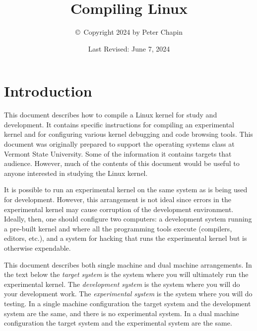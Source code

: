 \documentclass{article}
\newcommand{\newterm}[1]{\textit{#1}}
\begin{document}
\title{Compiling Linux}
\author{\copyright\ Copyright 2024 by Peter Chapin}
\date{Last Revised: June 7, 2024}
\maketitle

\tableofcontents
\newpage
{}

%
%
%

\section{Introduction}

This document describes how to compile a Linux kernel for study and development. It contains
specific instructions for compiling an experimental kernel and for configuring various kernel
debugging and code browsing tools. This document was originally prepared to support the
operating systems class at Vermont State University. Some of the information it contains targets
that audience. However, much of the contents of this document would be useful to anyone
interested in studying the Linux kernel.

It is possible to run an experimental kernel on the same system as is being used for
development. However, this arrangement is not ideal since errors in the experimental kernel may
cause corruption of the development environment. Ideally, then, one should configure two
computers: a development system running a pre-built kernel and where all the programming tools
execute (compilers, editors, etc.), and a system for hacking that runs the experimental kernel
but is otherwise expendable.

This document describes both single machine and dual machine arrangements. In the text below the
\newterm{target system} is the system where you will ultimately run the experimental kernel. The
\newterm{development system} is the system where you will do your development work. The
\newterm{experimental system} is the system where you will do testing. In a single machine
configuration the target system and the development system are the same, and there is no
experimental system. In a dual machine configuration the target system and the experimental
system are the same.
\end{document}

